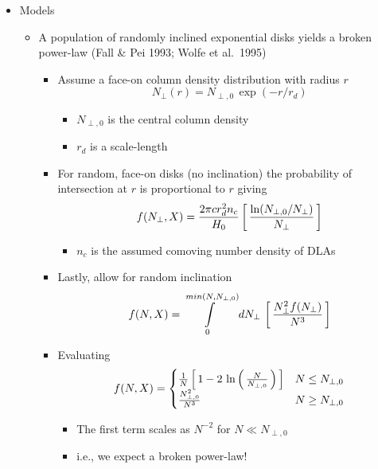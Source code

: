 \documentclass[12pt,letterpaper]{article}
\begin{document}
\begin{Aenumerate}
\begin{itemize}
  \item Models
    \begin{itemize}
    \item A population of randomly inclined exponential disks
    yields a broken power-law (Fall \& Pei 1993; Wolfe et al.\ 1995)
      \begin{itemize}
      \item Assume a face-on column density distribution with radius $r$
      \begin{equation}
      N_\perp (r) = N_{\perp,0} \, \exp(-r/r_d)
      \end{equation}
        \begin{itemize}
        \item $N_{\perp,0}$ is the central column density
        \item $r_d$ is a scale-length
        \end{itemize}
      \item For random, face-on disks (no inclination) the probability
      of intersection at $r$ is proportional to $r$ giving
      \begin{equation}
      f(N_\perp,X) = \frac{2 \pi c r_d^2 n_c}{H_0} \left [ \, \frac{\ln (N_{\perp,0}/N_\perp)}{N_\perp} \, \right ]
      \end{equation}
        \begin{itemize}
        \item $n_c$ is the assumed comoving number density of DLAs
        \end{itemize}
      \item Lastly, allow for random inclination
      \begin{equation}
      f(N,X) = \int\limits_0^{min(N,N_{\perp,0})} dN_\perp \, \left [ \, \frac{N_\perp^2 f(N_\perp)}{N^3} \, \right ]
      \end{equation}
      \item Evaluating 
      \begin{equation}
      f(N,X) = 
        \begin{cases}
        \frac{1}{N} \left [ \, 1 - 2 \, \ln \left ( \, \frac{N}{N_{\perp,0}} \, \right ) \, \right ] & N \le N_{\perp, 0} \\
        \frac{N_{\perp,0}^2}{N^3} & N \ge N_{\perp,0}
        \end{cases}
      \end{equation}
        \begin{itemize}
        \item The first term scales as $N^{-2}$ for $N \ll N_{\perp,0}$
        \item i.e., we expect a broken power-law!
        \end{itemize}


\end{itemize}
\end{itemize}
\end{itemize}
\end{Aenumerate}
\end{document}

